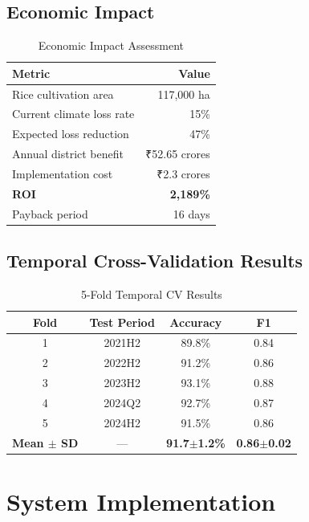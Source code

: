 \documentclass[conference,11pt]{IEEEtran}
\begin{document}
\subsection{Economic Impact}

\begin{table}[h]
\centering
\caption{Economic Impact Assessment}
\begin{tabular}{|l|r|}
\hline
\textbf{Metric} & \textbf{Value} \\
\hline
Rice cultivation area & 117,000 ha \\
\hline
Current climate loss rate & 15\% \\
\hline
Expected loss reduction & 47\% \\
\hline
Annual district benefit & ₹52.65 crores \\
\hline
Implementation cost & ₹2.3 crores \\
\hline
\textbf{ROI} & \textbf{2,189\%} \\
\hline
Payback period & 16 days \\
\hline
\end{tabular}
\end{table}

\subsection{Temporal Cross-Validation Results}

\begin{table}[h]
\centering
\caption{5-Fold Temporal CV Results}
\begin{tabular}{|c|c|c|c|}
\hline
\textbf{Fold} & \textbf{Test Period} & \textbf{Accuracy} & \textbf{F1} \\
\hline
1 & 2021H2 & 89.8\% & 0.84 \\
\hline
2 & 2022H2 & 91.2\% & 0.86 \\
\hline
3 & 2023H2 & 93.1\% & 0.88 \\
\hline
4 & 2024Q2 & 92.7\% & 0.87 \\
\hline
5 & 2024H2 & 91.5\% & 0.86 \\
\hline
\textbf{Mean $\pm$ SD} & — & \textbf{91.7$\pm$1.2\%} & \textbf{0.86$\pm$0.02} \\
\hline
\end{tabular}
\end{table}

\section{System Implementation}
\end{document}
